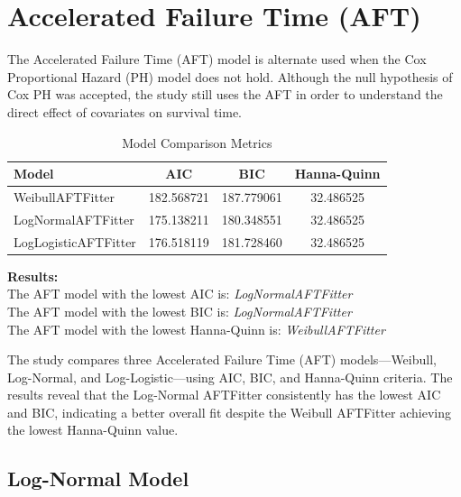 \documentclass[doublespacing]{report} %
\begin{document}
\section{Accelerated Failure Time (AFT) }

The Accelerated Failure Time (AFT) model is alternate used when the Cox Proportional Hazard (PH) model does not hold. Although the null hypothesis of Cox PH was accepted, the study still uses the AFT in order to understand the direct effect of covariates on survival time.

\begin{table}[H]
    \centering
    \begin{tabular}{lccc}
        \toprule
        Model & AIC & BIC & Hanna-Quinn \\
        \midrule
        WeibullAFTFitter & 182.568721 & 187.779061 & 32.486525 \\
        LogNormalAFTFitter & 175.138211 & 180.348551 & 32.486525 \\
        LogLogisticAFTFitter & 176.518119 & 181.728460 & 32.486525 \\
        \bottomrule
    \end{tabular}
    \caption{Model Comparison Metrics}
    \label{tab:model_comparison}
\end{table}

\noindent
\textbf{Results:} \\
The AFT model with the lowest AIC is: \textit{LogNormalAFTFitter} \\
The AFT model with the lowest BIC is: \textit{LogNormalAFTFitter} \\
The AFT model with the lowest Hanna-Quinn is: \textit{WeibullAFTFitter}

The study compares three Accelerated Failure Time (AFT) models—Weibull, Log-Normal, and Log-Logistic—using AIC, BIC, and Hanna-Quinn criteria. The results reveal that the Log-Normal AFTFitter consistently has the lowest AIC and BIC, indicating a better overall fit despite the Weibull AFTFitter achieving the lowest Hanna-Quinn value.

\subsection{Log-Normal Model}
\end{document}

